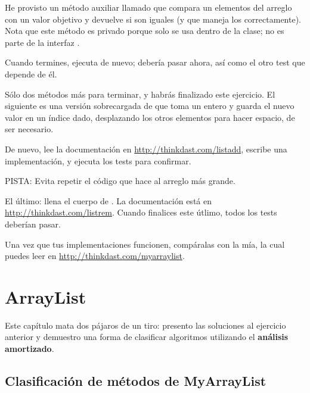 \documentclass[12pt]{book}
\theoremstyle{exercise}
\begin{document}

He provisto un método auxiliar llamado
 que compara un elementos del arreglo con un valor
objetivo y devuelve  si son iguales (y que maneja los
 correctamente). Nota que este método es privado porque solo
se usa dentro de la clase; no es parte de la interfaz .


Cuando termines, ejecuta  de nuevo;
 debería pasar ahora, así como el otro test que
depende de él.

Sólo dos métodos más para terminar, y habrás finalizado este
ejercicio. El siguiente es una versión sobrecargada de  que
toma un entero y guarda el nuevo valor en un índice dado, desplazando
los otros elementos para hacer espacio, de ser necesario.


De nuevo, lee la documentación en \url{http://thinkdast.com/listadd},
escribe una implementación, y ejecuta los tests para confirmar.

PISTA: Evita repetir el código que hace al arreglo más grande.

El último: llena el cuerpo de .  La documentación está en
\url{http://thinkdast.com/listrem}. Cuando finalices este útlimo, todos
los tests deberían pasar.


Una vez que tus implementaciones funcionen, compáralas con la mía,
la cual puedes leer en \url{http://thinkdast.com/myarraylist}.


\chapter{ArrayList}
\label{cs-analyzing-our-arraylist-readme}


Este capítulo mata dos pájaros de un tiro: presento las soluciones
al ejercicio anterior y demuestro una forma de clasificar
algoritmos utilizando el {\bf análisis amortizado}.



\section{Clasificación de métodos de MyArrayList}
\label{classifying-myarraylist-methods}
\end{document}
